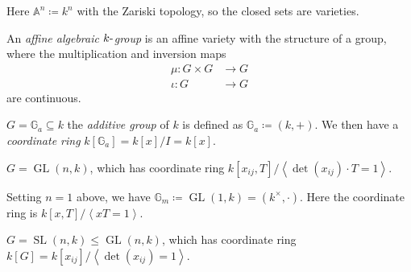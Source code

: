 Here \({\mathbb{A}}^n\coloneqq k^n\) with the Zariski topology, so the
closed sets are varieties.

\begin{definition}

An \emph{affine algebraic \(k{\hbox{-}}\)group} is an affine variety
with the structure of a group, where the multiplication and inversion
maps
\begin{align*}  
\mu: G\times G &\to G \\
\iota: G&\to G
\end{align*}
are continuous.

\end{definition}

\begin{example}

\(G = {\mathbb{G}}_a \subseteq k\) the \emph{additive group} of \(k\) is
defined as \({\mathbb{G}}_a \coloneqq(k, +)\). We then have a
\emph{coordinate ring} \(k[{\mathbb{G}}_a] = k[x] / I = k[x]\).

\end{example}

\begin{example}

\(G = \operatorname{GL}(n, k)\), which has coordinate ring
\(k[x_{ij}, T] / \left\langle{\det(x_{ij})\cdot T = 1}\right\rangle\).

\end{example}

\begin{example}

Setting \(n=1\) above, we have
\({\mathbb{G}}_m \coloneqq\operatorname{GL}(1, k) = (k^{\times}, \cdot)\).
Here the coordinate ring is
\(k[x, T] / \left\langle{xT = 1}\right\rangle\).

\end{example}

\begin{example}

\(G = {\operatorname{SL}}(n, k) \leq \operatorname{GL}(n, k)\), which
has coordinate ring
\(k[G] = k[x_{ij}] / \left\langle{\det(x_{ij}) = 1}\right\rangle\).

\end{example}

